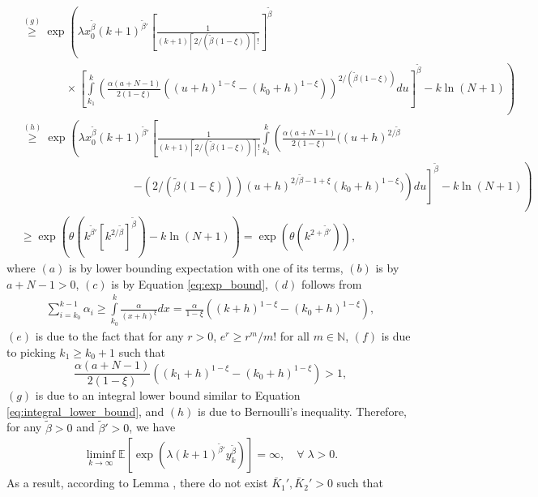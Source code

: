\documentclass[letterpaper, 10 pt]{article}
\begin{document}
\begin{align*}
    &\overset{(g)}{\geq} \exp\left(\lambda x_0^{\tilde{\beta}} (k\!+\!1)^{{\tilde{\beta}}'}\! \left[ \frac{1}{(k+1)\left\lceil 2/(\tilde{\beta}(1-\xi)) \right\rceil!}\right]^{\tilde{\beta}}\right.\\
    &\quad\quad \quad\quad\times\left. \left[\int\limits_{k_1}^k \left(\frac{\alpha (a\!+\!N\!-\!1)}{2(1\!-\!\xi)}((u\!+\!h)^{1-\xi}\!-\!(k_0\!+\!h)^{1-\xi})\right)^{ 2/(\tilde{\beta}(1-\xi)) } du \right]^{\tilde{\beta}}\!-\!k\ln(N\!+\!1)\right) \\
    &\overset{(h)}{\geq} \exp\left(\lambda x_0^{\tilde{\beta}} (k\!+\!1)^{{\tilde{\beta}}'}\! \left[ \frac{1}{(k+1)\left\lceil 2/(\tilde{\beta}(1-\xi)) \right\rceil!}\int\limits_{k_1}^k \left(\frac{\alpha (a\!+\!N\!-\!1)}{2(1\!-\!\xi)}(  (u\!+\!h)^{ 2/\tilde{\beta}}\!\right.\right.\right.\\
    & \quad\quad \quad\quad \quad\quad \quad\quad \quad\quad\left.\left.\left.-\!\left( 2/(\tilde{\beta}(1-\xi)) \right)(u\!+\!h)^{ 2/\tilde{\beta} -1+\xi}(k_0\!+\!h)^{1-\xi})\right) du \right]^{\tilde{\beta}}\!-\!k\ln(N\!+\!1)\right)\\
    &\geq \exp\left(\theta(k^{\tilde{\beta}'}[k^{2/\tilde{\beta}}]^{\tilde{\beta}})-k\ln(N+1)\right) = \exp\left(\theta (k^{2+\tilde{\beta}'})\right),
\end{align*}
where $(a)$ is by lower bounding expectation with one of its terms, $(b)$ is by $a+N-1>0$, $(c)$ is by Equation \eqref{eq:exp_bound}, $(d)$ follows from
\begin{align}\label{eq:integral_lower_bound}
    \sum_{i=k_0}^{k-1}\alpha_i
    \geq \int\limits_{k_0}^k\frac{\alpha}{(x+h)^\xi}dx
    = 
    \frac{\alpha}{1-\xi}((k+h)^{1-\xi}-(k_0+h)^{1-\xi}),
\end{align}
$(e)$ is due to the fact that for any $r>0$, $e^{r}\geq r^m/m!$ for all $m\in\mathbb{N}$, $(f)$ is due to picking $k_1\geq k_0+1$ such that
\[ \frac{\alpha (a\!+\!N\!-\!1)}{2(1\!-\!\xi)}((k_1\!+\!h)^{1-\xi}\!-\!(k_0\!+\!h)^{1-\xi}) >1, \]
$(g)$ is due to an integral lower bound similar to Equation \eqref{eq:integral_lower_bound}, and $(h)$ is due to Bernoulli's inequality. Therefore, for any $\tilde{\beta}>0$ and $\tilde{\beta}'>0$, we have
\begin{align*}
        \liminf\limits_{k \to\infty} \mathbb{E} \left[\exp\left(\lambda (k+1)^{{\tilde{ \beta}}'} y_k^{\tilde{ \beta}} \right)\right] = \infty, \quad \forall\;\lambda>0.
\end{align*}
As a result, according to Lemma \cite[Lemma 4.1]{chen2023concentration}, there do not exist $\bar{K}_1',\bar{K}_2'>0$ such that 
\end{document}
